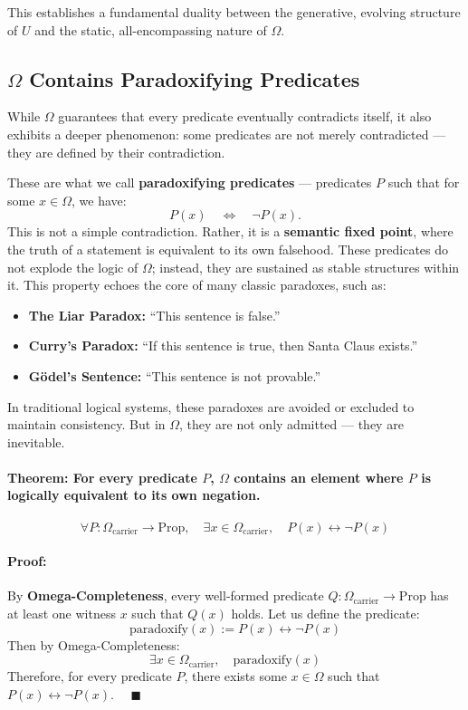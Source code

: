 \documentclass[12pt]{article}
\begin{document}
This establishes a fundamental duality between the generative, evolving structure of \( U \) and the static, all-encompassing nature of \( \Omega \).


\subsection{\( \Omega \) Contains Paradoxifying Predicates}

While \( \Omega \) guarantees that every predicate eventually contradicts itself, it also exhibits a deeper phenomenon: some predicates are not merely contradicted — they are defined by their contradiction.

These are what we call \textbf{paradoxifying predicates} — predicates \( P \) such that for some \( x \in \Omega \), we have:
\[
P(x) \quad \Longleftrightarrow \quad \neg P(x).
\]
This is not a simple contradiction. Rather, it is a \textbf{semantic fixed point}, where the truth of a statement is equivalent to its own falsehood. These predicates do not explode the logic of \( \Omega \); instead, they are sustained as stable structures within it. This property echoes the core of many classic paradoxes, such as:

\begin{itemize}
    \item \textbf{The Liar Paradox:} “This sentence is false.”
    \item \textbf{Curry's Paradox:} “If this sentence is true, then Santa Claus exists.”
    \item \textbf{Gödel’s Sentence:} “This sentence is not provable.”
\end{itemize}

In traditional logical systems, these paradoxes are avoided or excluded to maintain consistency. But in \( \Omega \), they are not only admitted — they are inevitable.

\paragraph{Theorem: For every predicate \( P \), \( \Omega \) contains an element where \( P \) is logically equivalent to its own negation.}
\begin{equation}
\forall P: \Omega_{\text{carrier}} \to \text{Prop}, \quad \exists x \in \Omega_{\text{carrier}}, \quad P(x) \leftrightarrow \neg P(x)
\end{equation}

\paragraph{Proof:}  
By \textbf{Omega-Completeness}, every well-formed predicate \( Q: \Omega_{\text{carrier}} \to \text{Prop} \) has at least one witness \( x \) such that \( Q(x) \) holds. Let us define the predicate:
\[
\text{paradoxify}(x) := P(x) \leftrightarrow \neg P(x)
\]
Then by Omega-Completeness:
\[
\exists x \in \Omega_{\text{carrier}}, \quad \text{paradoxify}(x)
\]
Therefore, for every predicate \( P \), there exists some \( x \in \Omega \) such that \( P(x) \leftrightarrow \neg P(x) \). \(\quad \blacksquare\)
\end{document}
